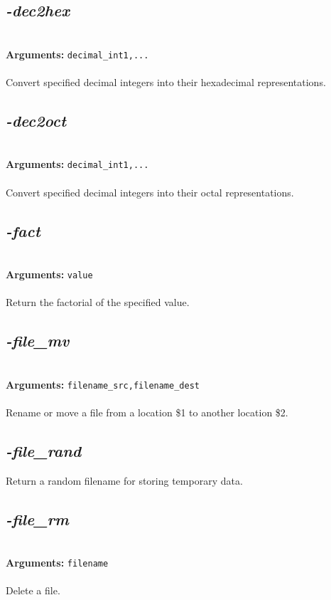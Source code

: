 \documentclass[a4paper,11pt,twoside]{book}
\begin{document}
\subsection{\emph{-dec2hex} }\vspace*{-0.5em}
~\\\textbf{Arguments: } 
{\small \texttt{decimal\_int1,...}}\\~\\
Convert specified decimal integers into their hexadecimal representations.


\subsection{\emph{-dec2oct} }\vspace*{-0.5em}
~\\\textbf{Arguments: } 
{\small \texttt{decimal\_int1,...}}\\~\\
Convert specified decimal integers into their octal representations.


\subsection{\emph{-fact} }\vspace*{-0.5em}
~\\\textbf{Arguments: } 
{\small \texttt{value}}\\~\\
Return the factorial of the specified value.


\subsection{\emph{-file\_mv} }\vspace*{-0.5em}
~\\\textbf{Arguments: } 
{\small \texttt{filename\_src,filename\_dest}}\\~\\
Rename or move a file from a location \$1 to another location \$2.


\subsection{\emph{-file\_rand} }\vspace*{-0.5em}
Return a random filename for storing temporary data.


\subsection{\emph{-file\_rm} }\vspace*{-0.5em}
~\\\textbf{Arguments: } 
{\small \texttt{filename}}\\~\\
Delete a file.
\end{document}
